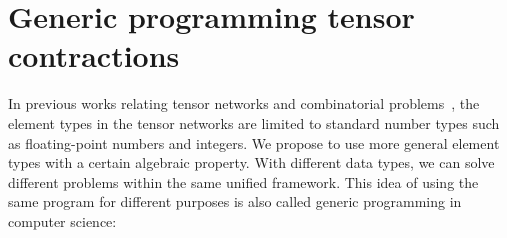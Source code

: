 \documentclass[review, onefignum, onetabnum]{siamart190516}
\begin{document}
\section{Generic programming tensor contractions}\label{sec:generic}
In previous works relating tensor networks and combinatorial problems~\cite{Kourtis2019, Biamonte2017}, the element types in the tensor networks are limited to standard number types such as floating-point numbers and integers.
We propose to use more general element types with a certain algebraic property.
With different data types, we can solve different problems within the same unified framework.
This idea of using the same program for different purposes is also called generic programming in computer science:
\end{document}
